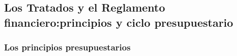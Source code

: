 \documentclass[11pt]{article}
\begin{document}
\begin{infografia}[H]
\centering
\caption{La constitución financiera de la Unión: qué fija cada texto y cómo se aprueba}\label{figu:constitucion}
\end{infografia}

\subsection{Los Tratados y el Reglamento financiero:\cortetitulo principios y ciclo presupuestario}\label{sec:principios-ciclo}

\subsubsection{Los principios presupuestarios}\label{sec:principios}
\end{document}
